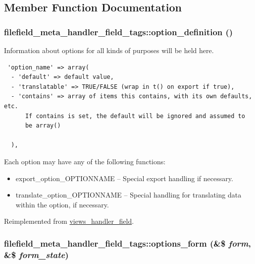 \subsection{Member Function Documentation}
\hypertarget{classfilefield__meta__handler__field__tags_9e809bb733cce1fcd37a59a251c70014}{
\subsubsection[{option\_\-definition}]{\setlength{\rightskip}{0pt plus 5cm}filefield\_\-meta\_\-handler\_\-field\_\-tags::option\_\-definition ()}}
\label{classfilefield__meta__handler__field__tags_9e809bb733cce1fcd37a59a251c70014}


Information about options for all kinds of purposes will be held here. 

\begin{Code}\begin{verbatim} 'option_name' => array(
  - 'default' => default value,
  - 'translatable' => TRUE/FALSE (wrap in t() on export if true),
  - 'contains' => array of items this contains, with its own defaults, etc.
      If contains is set, the default will be ignored and assumed to
      be array()

  ),
\end{verbatim}
\end{Code}

 Each option may have any of the following functions:\begin{itemize}
\item export\_\-option\_\-OPTIONNAME -- Special export handling if necessary.\item translate\_\-option\_\-OPTIONNAME -- Special handling for translating data within the option, if necessary. \end{itemize}


Reimplemented from \hyperlink{classviews__handler__field_64c69a8a3697603f8283405071c25b76}{views\_\-handler\_\-field}.\hypertarget{classfilefield__meta__handler__field__tags_b95bd58dd3d2486b63c2498410cc65be}{
\subsubsection[{options\_\-form}]{\setlength{\rightskip}{0pt plus 5cm}filefield\_\-meta\_\-handler\_\-field\_\-tags::options\_\-form (\&\$ {\em form}, \/  \&\$ {\em form\_\-state})}}
\label{classfilefield__meta__handler__field__tags_b95bd58dd3d2486b63c2498410cc65be}



